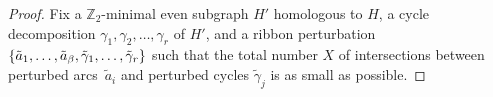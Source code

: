 \documentclass[letterpaper,review]{siamart190516}
\def\Z{\mathbb{Z}}
\let\eps\varepsilon
\def\jnote#1{\textcolor{orange}{Jeff: #1}}
\begin{document}
\begin{proof}
%
%
Fix a $\Z_2$-minimal even subgraph $H'$ homologous to $H$, a cycle decomposition $\gamma_1, \gamma_2, \dots, \gamma_r$ of $H'$, and a ribbon perturbation $\{ \tilde{a}_1, \dots, \tilde{a}_\beta, \tilde\gamma_1, \dots, \tilde\gamma_r \}$ such that the total number $X$ of intersections between perturbed arcs~$\tilde{a}_i$ and perturbed cycles $\tilde\gamma_j$ is as small as possible.


\end{proof}
\end{document}
